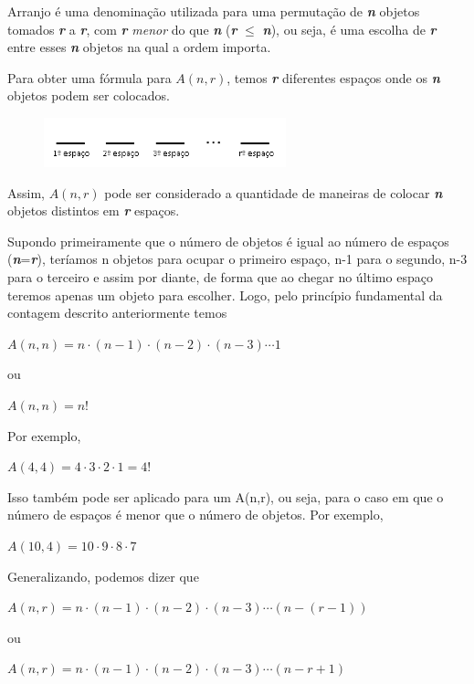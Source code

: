 Arranjo é uma denominação utilizada para uma permutação de \textbf{\textit{n}} objetos tomados \textbf{\textit{r}} a \textbf{\textit{r}}, com \textbf{\textit{r}} \textit{menor} do que \textbf{\textit{n}} (\textbf{\textit{r}} $\leq$ \textbf{\textit{n}}), ou seja, é uma escolha de \textbf{\textit{r}} entre esses \textbf{\textit{n}} objetos na qual a ordem importa.

Para obter uma fórmula para $A(n,r)$, temos \textbf{\textit{r}} diferentes espaços onde os \textbf{\textit{n}} objetos podem ser colocados.

\begin{figure}[H]
	\centering

	\includegraphics[width=7cm]{imagens/arranjo_demo.png}

\end{figure}

Assim, $A(n,r)$ pode ser considerado a quantidade de maneiras de colocar \textbf{\textit{n}} objetos distintos em \textbf{\textit{r}} espaços.

Supondo primeiramente que o número de objetos é igual ao número de espaços (\textbf{\textit{n}}=\textbf{\textit{r}}), teríamos n objetos para ocupar o primeiro espaço, n-1 para o segundo, n-3 para o terceiro e assim por diante, de forma que ao chegar no último espaço teremos apenas um objeto para escolher.
Logo, pelo princípio fundamental da contagem descrito anteriormente temos
\begin{center}
	$A(n,n)=n \cdot (n-1) \cdot (n-2) \cdot (n-3)\cdots 1$
	
ou

	$A(n,n)=n!$
\end{center}

\noindent 
Por exemplo, 
\begin{center}
	$A(4,4)= 4 \cdot 3 \cdot 2 \cdot 1 = 4!$
\end{center}
Isso também pode ser aplicado para um A(n,r), ou seja, para o caso em que o número de espaços é menor que o número de objetos. Por exemplo,
\begin{center}
	$A(10,4)= 10 \cdot 9 \cdot 8 \cdot 7$
\end{center}
Generalizando, podemos dizer que
\begin{center}
	$A(n,r) = n \cdot (n-1) \cdot (n-2) \cdot (n-3) \cdots (n-(r-1))$

ou

	$A(n,r) = n \cdot (n-1) \cdot (n-2) \cdot (n-3) \cdots (n-r+1)$
\end{center}

